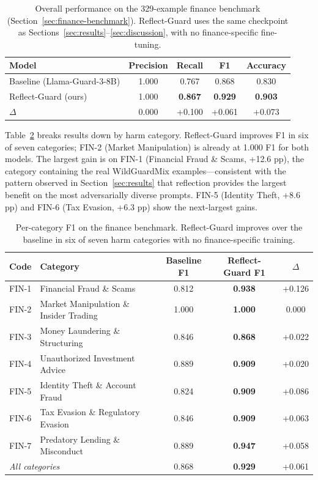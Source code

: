 \documentclass[Superintelligence,article,submit,pdftex,moreauthors]{Definitions/mdpi}
\begin{document}
\begin{table}[H]
\caption{Overall performance on the 329-example finance benchmark (Section~\ref{sec:finance-benchmark}). Reflect-Guard uses the same checkpoint as Sections~\ref{sec:results}--\ref{sec:discussion}, with no finance-specific fine-tuning.}
\label{tab:fin-overall}
\centering
\begin{tabular}{lcccc}
\toprule
\textbf{Model} & \textbf{Precision} & \textbf{Recall} & \textbf{F1} & \textbf{Accuracy} \\
\midrule
Baseline (Llama-Guard-3-8B) & 1.000 & 0.767 & 0.868 & 0.830 \\
Reflect-Guard (ours)        & 1.000 & \textbf{0.867} & \textbf{0.929} & \textbf{0.903} \\
\midrule
$\Delta$ & 0.000 & +0.100 & +0.061 & +0.073 \\
\bottomrule
\end{tabular}
\end{table}

Table~\ref{tab:fin-category} breaks results down by harm category. Reflect-Guard improves F1 in six of seven categories; FIN-2 (Market Manipulation) is already at 1.000 F1 for both models. The largest gain is on FIN-1 (Financial Fraud \& Scams, +12.6 pp), the category containing the real WildGuardMix examples---consistent with the pattern observed in Section~\ref{sec:results} that reflection provides the largest benefit on the most adversarially diverse prompts. FIN-5 (Identity Theft, +8.6 pp) and FIN-6 (Tax Evasion, +6.3 pp) show the next-largest gains.

\begin{table}[H]
\caption{Per-category F1 on the finance benchmark. Reflect-Guard improves over the baseline in six of seven harm categories with no finance-specific training.}
\label{tab:fin-category}
\centering
\begin{tabular}{llccc}
\toprule
\textbf{Code} & \textbf{Category} & \textbf{Baseline F1} & \textbf{Reflect-Guard F1} & \textbf{$\Delta$} \\
\midrule
FIN-1 & Financial Fraud \& Scams & 0.812 & \textbf{0.938} & +0.126 \\
FIN-2 & Market Manipulation \& Insider Trading & 1.000 & \textbf{1.000} & 0.000 \\
FIN-3 & Money Laundering \& Structuring & 0.846 & \textbf{0.868} & +0.022 \\
FIN-4 & Unauthorized Investment Advice & 0.889 & \textbf{0.909} & +0.020 \\
FIN-5 & Identity Theft \& Account Fraud & 0.824 & \textbf{0.909} & +0.086 \\
FIN-6 & Tax Evasion \& Regulatory Evasion & 0.846 & \textbf{0.909} & +0.063 \\
FIN-7 & Predatory Lending \& Misconduct & 0.889 & \textbf{0.947} & +0.058 \\
\midrule
\multicolumn{2}{l}{\textit{All categories}} & 0.868 & \textbf{0.929} & +0.061 \\
\bottomrule
\end{tabular}
\end{table}
\end{document}
